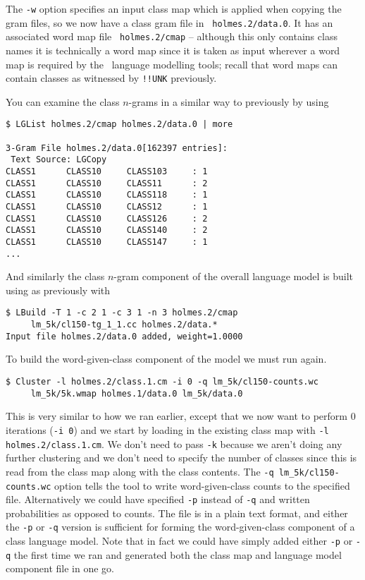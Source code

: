 The {\tt -w} option specifies an input class map which is applied when
copying the gram files, so we now have a class gram file in {\tt
holmes.2/data.0}.  It has an associated word map file {\tt
holmes.2/cmap} -- although this only contains class names it is
technically a word map since it is taken as input wherever a word map
is required by the \HTK\ language modelling tools; recall that word
maps can contain classes as witnessed by {\tt !!UNK} previously.

You can examine the class $n$-grams in a similar way to previously by
using 
\begin{verbatim}
$ LGList holmes.2/cmap holmes.2/data.0 | more 
 
3-Gram File holmes.2/data.0[162397 entries]:
 Text Source: LGCopy
CLASS1      CLASS10     CLASS103     : 1
CLASS1      CLASS10     CLASS11      : 2
CLASS1      CLASS10     CLASS118     : 1
CLASS1      CLASS10     CLASS12      : 1
CLASS1      CLASS10     CLASS126     : 2
CLASS1      CLASS10     CLASS140     : 2
CLASS1      CLASS10     CLASS147     : 1
...
\end{verbatim} %

And similarly the class $n$-gram component of the overall language
model is built using  as previously with
\begin{verbatim}
$ LBuild -T 1 -c 2 1 -c 3 1 -n 3 holmes.2/cmap
     lm_5k/cl150-tg_1_1.cc holmes.2/data.*
Input file holmes.2/data.0 added, weight=1.0000
\end{verbatim} %

To build the word-given-class component of the model we must run
 again.
\begin{verbatim}
$ Cluster -l holmes.2/class.1.cm -i 0 -q lm_5k/cl150-counts.wc
     lm_5k/5k.wmap holmes.1/data.0 lm_5k/data.0
\end{verbatim} %

This is very similar to how we ran  earlier, except
that we now want to perform 0 iterations ({\tt -i 0}) and we start by
loading in the existing class map with {\tt -l holmes.2/class.1.cm}.
We don't need to pass {\tt -k} because we aren't doing any further
clustering and we don't need to specify the number of classes since
this is read from the class map along with the class contents.  The
{\tt -q lm\_5k/cl150-counts.wc} option tells the tool to write 
word-given-class counts to the specified file.  Alternatively we could
have specified {\tt -p} instead of {\tt -q} and written probabilities
as opposed to counts.  The file is in a plain text format, and either
the {\tt -p} or {\tt -q} version is sufficient for forming the
word-given-class component of a class language model.  Note that in
fact we could have simply added either {\tt -p} or {\tt -q} the
first time we ran  and generated both the class map and
language model component file in one go.

